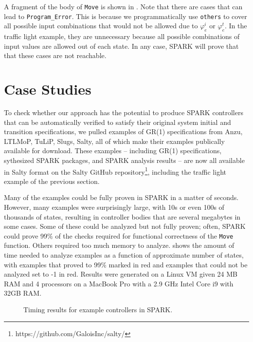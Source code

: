 \documentclass[runningheads]{llncs}
\begin{document}
A fragment of the body of \lstinline{Move} is shown in . 
Note that there are cases that can lead to \lstinline{Program_Error}. 
This is because we programmatically use \lstinline{others} to cover all possible input combinations 
that would not be allowed due to $\varphi_e^i$ or $\varphi_e^t$. 
In the traffic light example, they are unnecessary because all possible combinations of input values are 
allowed out of each state. 
In any case, SPARK will prove that that these cases are not reachable.


\section{Case Studies}
\label{sec:caseStudies}

To check whether our approach has the potential to produce SPARK controllers that can be automatically verified to satisfy their original system initial and transition specifications, 
we pulled examples of GR(1) specifications from Anzu, LTLMoP, TuLiP, Slugs, Salty, all of which make their examples publically available for download. 
These examples -- including GR(1) specifications, sythesized SPARK packages, and SPARK analysis results -- are now all available in Salty format on the 
Salty GitHub repository\footnote{https://github.com/GaloisInc/salty/}, including the traffic light example of the previous section. 

Many of the examples could be fully proven in SPARK in a matter of seconds.   
However, many examples were surprisingly large, with 10s or even 100s of thousands of states, 
resulting in controller bodies that are several megabytes in some cases. 
Some of these could be analyzed but not fully proven; often, SPARK could prove 99\% of the checks required for functional correctness of the \lstinline{Move} function. 
Others required too much memory to analyze.
 shows the amount of time needed to analyze examples as a function of approximate number of states, 
with examples that proved to 99\% marked in red and examples that could not be analyzed set to -1 in red. 
Results were generated on a Linux VM given 24 MB RAM and 4 processors on a MacBook Pro with a 2.9 GHz Intel Core i9 with 32GB RAM.

\begin{figure}
\caption{Timing results for example controllers in SPARK.}
\label{fig:timingResults}
\end{figure}
\end{document}
